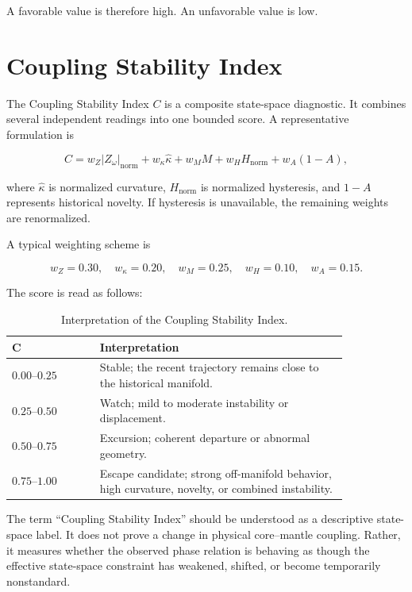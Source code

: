 \documentclass[11pt]{article}
\begin{document}
A favorable value is therefore high. An unfavorable value is low.

\section{Coupling Stability Index}

The Coupling Stability Index \(C\) is a composite state-space diagnostic. It combines several independent readings into one bounded score. A representative formulation is

\begin{equation}
C =
w_Z |Z_{\omega}|_{\mathrm{norm}}
+
w_{\kappa}\hat{\kappa}
+
w_M M
+
w_H H_{\mathrm{norm}}
+
w_A(1-A),
\end{equation}

where \(\hat{\kappa}\) is normalized curvature, \(H_{\mathrm{norm}}\) is normalized hysteresis, and \(1-A\) represents historical novelty. If hysteresis is unavailable, the remaining weights are renormalized.

A typical weighting scheme is

\begin{equation}
w_Z=0.30,\quad
w_{\kappa}=0.20,\quad
w_M=0.25,\quad
w_H=0.10,\quad
w_A=0.15.
\end{equation}

The score is read as follows:

\begin{table}[H]
\centering
\caption{Interpretation of the Coupling Stability Index.}
\begin{tabular}{>{\raggedleft\arraybackslash}p{0.22\linewidth} p{0.62\linewidth}}
\toprule
\(\boldsymbol{C}\) & Interpretation \\
\midrule
\(0.00\)--\(0.25\) & Stable; the recent trajectory remains close to the historical manifold. \\
\(0.25\)--\(0.50\) & Watch; mild to moderate instability or displacement. \\
\(0.50\)--\(0.75\) & Excursion; coherent departure or abnormal geometry. \\
\(0.75\)--\(1.00\) & Escape candidate; strong off-manifold behavior, high curvature, novelty, or combined instability. \\
\bottomrule
\end{tabular}
\end{table}

The term ``Coupling Stability Index'' should be understood as a descriptive state-space label. It does not prove a change in physical core--mantle coupling. Rather, it measures whether the observed phase relation is behaving as though the effective state-space constraint has weakened, shifted, or become temporarily nonstandard.
\end{document}
